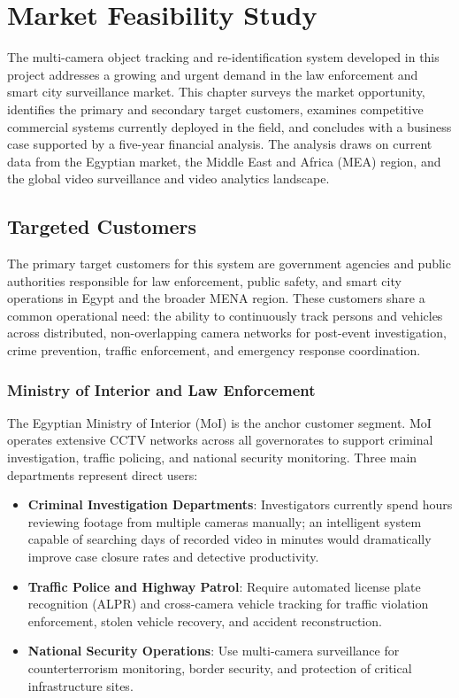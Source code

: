 \chapter{Market Feasibility Study}

The multi-camera object tracking and re-identification system developed in this project addresses a growing and urgent demand in the law enforcement and smart city surveillance market. This chapter surveys the market opportunity, identifies the primary and secondary target customers, examines competitive commercial systems currently deployed in the field, and concludes with a business case supported by a five-year financial analysis. The analysis draws on current data from the Egyptian market, the Middle East and Africa (MEA) region, and the global video surveillance and video analytics landscape.

\section{Targeted Customers}

The primary target customers for this system are government agencies and public authorities responsible for law enforcement, public safety, and smart city operations in Egypt and the broader MENA region. These customers share a common operational need: the ability to continuously track persons and vehicles across distributed, non-overlapping camera networks for post-event investigation, crime prevention, traffic enforcement, and emergency response coordination.

\subsection{Ministry of Interior and Law Enforcement}

The Egyptian Ministry of Interior (MoI) is the anchor customer segment. MoI operates extensive CCTV networks across all governorates to support criminal investigation, traffic policing, and national security monitoring. Three main departments represent direct users:

\begin{itemize}
    \item \textbf{Criminal Investigation Departments}: Investigators currently spend hours reviewing footage from multiple cameras manually; an intelligent system capable of searching days of recorded video in minutes would dramatically improve case closure rates and detective productivity.
    \item \textbf{Traffic Police and Highway Patrol}: Require automated license plate recognition (ALPR) and cross-camera vehicle tracking for traffic violation enforcement, stolen vehicle recovery, and accident reconstruction.
    \item \textbf{National Security Operations}: Use multi-camera surveillance for counterterrorism monitoring, border security, and protection of critical infrastructure sites.
\end{itemize}

